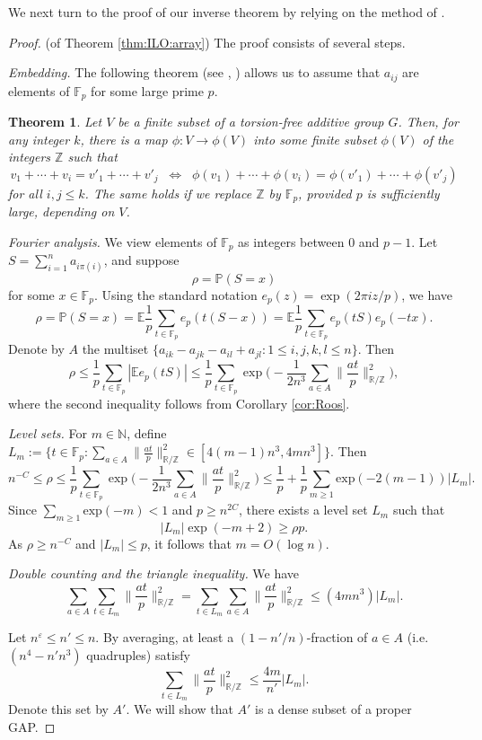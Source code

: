 \documentclass[reqno]{amsart}
\newcommand\R{{\mathbb{R}}}
\newcommand\Z{{\mathbb{Z}}}
\renewcommand\P{{\mathbb{P}}}
\newcommand\E{{\mathbb{E}}}
\newcommand\F{{\mathbb{F}}}
\newcommand\eps{{\varepsilon}}
\newcommand\BBN{{\mathbb N}}
\theoremstyle{plain}
\newtheorem{theorem}{Theorem}[section]
\theoremstyle{definition}
\begin{document}
We next turn to the proof of our inverse theorem by relying on the method of \cite{NgV-Adv}.
\begin{proof} (of Theorem \ref{thm:ILO:array}) The proof consists of several steps.

\textit{Embedding.}
The following theorem (see \cite[Lemma 5.25]{TVbook}, \cite[Theorem 4.3]{NgV-Adv}) allows us to assume that $a_{ij}$ are elements of $\F_p$ for some large prime $p$. 
\begin{theorem}
Let $V$ be a finite subset of a torsion-free additive group $G$. Then, for any integer $k$, there is a map $\phi : V \to \phi(V)$ into some finite subset $\phi(V)$ of the integers $\Z$ such that
$$
v_1 + \cdots + v_i=v'_1 + \cdots + v'_j 
\;\;\Longleftrightarrow\;\;
\phi(v_1) + \cdots + \phi(v_i)=\phi(v'_1) + \cdots + \phi(v'_j)
$$
for all $i,j \le k$. The same holds if we replace $\Z$ by $\F_p$, provided $p$ is sufficiently large, depending on $V$.
\end{theorem}

\textit{Fourier analysis.}
We view elements of $\F_p$ as integers between $0$ and $p-1$. Let $S=\sum_{i=1}^na_{i\pi(i)}$, and suppose 
$$    
\rho=\P(S=x)
$$
for some $x \in \F_p$. Using the standard notation $e_p(z)=\exp(2\pi i z/p)$, we have
$$
\rho = \P(S=x)=\E\frac{1}{p}\sum_{t \in \F_p}e_p(t(S-x))=\E\frac{1}{p}\sum_{t \in \F_p}e_p(tS)e_p(-tx).
$$
Denote by $A$ the multiset $\{a_{i k} - a_{j k} - a_{i l} + a_{j l}:1\le i,j,k,l\le n\}$. Then
$$
\rho \le \frac{1}{p}\sum_{t\in \F_p}|\E e_p(tS)| \le \frac{1}{p}\sum_{t \in \F_p}\exp \Big(-\frac{1}{2n^3}\sum_{a\in A}\|\frac{at}{p}\|_{\R/\Z}^2\Big),
$$
where the second inequality follows from Corollary \ref{cor:Roos}. 

\textit{Level sets.}
For $m\in \BBN$, define $L_m:=\big\{t \in \F_p: \sum_{a\in A}\|\frac{at}{p}\|_{\R/\Z}^2\in [4(m-1)n^3,4mn^3]\big\}$. Then
$$
n^{-C}\le \rho \le \frac{1}{p}\sum_{t \in \F_p}\exp \Big(-\frac{1}{2n^3}\sum_{a\in A}\|\frac{at}{p}\|_{\R/\Z}^2\Big) \le \frac{1}{p}+\frac{1}{p}\sum_{m\ge 1}\text{exp}(-2(m-1))|L_m|.
$$
Since $\sum_{m\ge 1}\text{exp}(-m)<1$ and $p\ge n^{2C}$, there exists a level set $L_m$ such that 
$$
|L_m|\exp(-m+2)\ge\rho p.
$$ 
As $\rho \ge n^{-C}$ and $|L_m|\le p$, it follows that $m=O(\log n)$.

\textit{Double counting and the triangle inequality.}
We have 
$$
\sum_{a\in A}\sum_{t \in L_m}\|\frac{at}{p}\|_{\R/\Z}^2=\sum_{t \in L_m}\sum_{a\in A}\|\frac{at}{p}\|_{\R/\Z}^2\le  (4mn^3)|L_m|.
$$

Let $n^{\eps} \le n' \le n$. By averaging, at least a $(1-n'/n)$-fraction of $a\in A$ (i.e. $(n^{4}-n'n^{3})$ quadruples) satisfy
$$
\sum_{t \in L_m}\|\frac{at}{p}\|_{\R/\Z}^2\le\frac{4m}{n'}|L_m|.
$$
Denote this set by $A'$. We will show that $A'$ is a dense subset of a proper GAP.


\end{proof}
\end{document}
